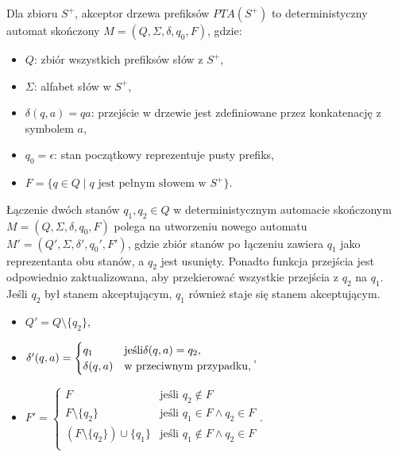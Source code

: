 \begin{definition}  
    Dla zbioru \( S^+ \), akceptor drzewa prefiksów \( PTA(S^+) \) to deterministyczny automat skończony \( M = (Q, \Sigma, \delta, q_0, F) \), gdzie:
    \begin{itemize}
        \item \( Q \): zbiór wszystkich prefiksów słów z \( S^+ \),
        \item \( \Sigma \): alfabet słów w \( S^+ \),
        \item \( \delta(q, a) = qa \): przejście w drzewie jest zdefiniowane przez konkatenację z symbolem \( a \),
        \item \( q_0 = \epsilon \): stan początkowy reprezentuje pusty prefiks,
        \item \( F = \{q \in Q \mid q \text{ jest pełnym słowem w } S^+\}\).
    \end{itemize}
\end{definition}

\begin{definition}
    \label{def:state_merging}
    Łączenie dwóch stanów \( q_1, q_2 \in Q \) w deterministycznym automacie skończonym \( M = (Q, \Sigma, \delta, q_0, F) \) polega na utworzeniu nowego automatu \( M' = (Q', \Sigma, \delta', q_0', F') \), gdzie zbiór stanów po łączeniu zawiera \( q_1 \) jako reprezentanta obu stanów, a \( q_2 \) jest usunięty. Ponadto funkcja przejścia jest odpowiednio zaktualizowana, aby przekierować wszystkie przejścia z \( q_2 \) na \( q_1 \). Jeśli \( q_2 \) był stanem akceptującym, \( q_1 \) również staje się stanem akceptującym.
    \begin{itemize}
        \item \( Q' = Q \setminus \{q_2\} \),
        \item \( \delta'(q, a) = 
        \begin{cases} 
            q_1 & \text{jeśli} \space \delta(q, a) = q_2, \\
            \delta(q, a) & \text{w przeciwnym przypadku,}
        \end{cases}
        \),
        \item \( F' =
        \begin{cases} 
            F & \text{jeśli } q_2 \notin F \\
            F \setminus \{q_2\} & \text{jeśli } q_1 \in F \land q_2 \in F \\
            (F \setminus \{q_2\}) \cup \{q_1\} & \text{jeśli } q_1 \notin F \land q_2 \in F \\
        \end{cases}
        \).
    \end{itemize}
\end{definition}


